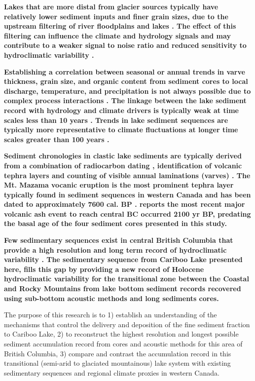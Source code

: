 \documentclass[Royal,times,doublespace,sageh]{sagej}
\begin{document}
\textbf{Lakes that are more distal from glacier sources typically have
relatively lower sediment inputs and finer grain sizes, due to the
upstream filtering of river floodplains and lakes \citep{Hodder2007c}.
The effect of this filtering can influence the climate and hydrology
signals and may contribute to a weaker signal to noise ratio and reduced
sensitivity to hydroclimatic variability \citep{Jerolmack2010}.}

\textbf{Establishing a correlation between seasonal or annual trends in
varve thickness, grain size, and organic content from sediment cores to
local discharge, temperature, and precipitation is not always possible
due to complex process interactions
\citep{Hodder2007c, Menounos2008c, Heideman2017}. The linkage between
the lake sediment record with hydrology and climate drivers is typically
weak at time scales less than 10 years
\citep{Hodder2007c, Menounos2008c, Heideman2017}. Trends in lake
sediment sequences are typically more representative to climate
fluctuations at longer time scales greater than 100 years
\citep{Leonard1999, Osborn2007, Heideman2017}.}

\textbf{Sediment chronologies in clastic lake sediments are typically
derived from a combination of radiocarbon dating
\citep{Gilbert2012, Hodder2006b, Steinman2019}, identification of
volcanic tephra layers \citep{Gilbert2012, Hodder2006b, Steinman2019}
and counting of visible annual laminations (varves)
\citep{Hodder2006b, Heideman2015}. The Mt. Mazama vocanic eruption is
the most prominent tephra layer typically found in sediment sequences in
western Canada \citep{Gilbert2012, Steinman2019} and has been dated to
approximately 7600 cal. BP \citep{Zdanowicz1999, Hallett1997}.
\citet{Westgate1977} reports the most recent major volcanic ash event to
reach central BC occurred 2100 yr BP, predating the basal age of the
four sediment cores presented in this study.}

\textbf{Few sedimentary sequences exist in central British Columbia that
provide a high resolution and long term record of hydroclimatic
variability
\citep{Gilbert2012, Hodder2006b, Menounos2009b, Maurer2012b}. The
sedimentary sequence from Cariboo Lake presented here, fills this gap by
providing a new record of Holocene hydroclimatic variability for the
transitional zone between the Coastal and Rocky Mountains from lake
bottom sediment records recovered using sub-bottom acoustic methods and
long sediments cores.}

The purpose of this research is to 1) establish an understanding of the
mechanisms that control the delivery and deposition of the fine sediment
fraction to Cariboo Lake, 2) to reconstruct the highest resolution and
longest possible sediment accumulation record from cores and acoustic
methods for this area of British Columbia, 3) compare and contrast the
accumulation record in this transitional (semi-arid to glaciated
mountainous) lake system with existing sedimentary sequences and
regional climate proxies in western Canada.
\end{document}
